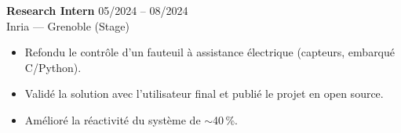 \documentclass[10pt,a4paper]{article}
\begin{document}
\noindent\textbf{Research Intern} \hfill 05/2024 -- 08/2024\\
{\small Inria --- Grenoble (Stage)}
\begin{itemize}
  \item Refondu le contrôle d'un fauteuil à assistance électrique (capteurs, embarqué C/Python).
  \item Validé la solution avec l'utilisateur final et publié le projet en open source.
  \item Amélioré la réactivité du système de $\sim$40\,\%.
\end{itemize}
\end{document}
